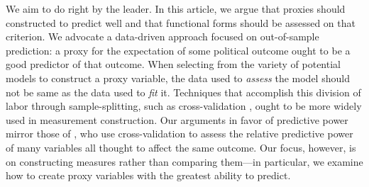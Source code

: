 
We aim to do right by the leader.  In this article, we argue that proxies should constructed to predict well and that functional forms should be assessed on that criterion.
We advocate a data-driven approach focused on out-of-sample prediction: a proxy for the expectation of some political outcome ought to be a good predictor of that outcome.
When selecting from the variety of potential models to construct a proxy variable, the data used to \emph{assess} the model should not be same as the data used to \emph{fit} it.
Techniques that accomplish this division of labor through sample-splitting, such as cross-validation \citep{Efron:2012es}, ought to be more widely used in measurement construction.
Our arguments in favor of predictive power mirror those of \citet{Hill:2014ki}, who use cross-validation to assess the relative predictive power of many variables all thought to affect the same outcome.
Our focus, however, is on constructing measures rather than comparing them---in particular, we examine how to create proxy variables with the greatest ability to predict.

